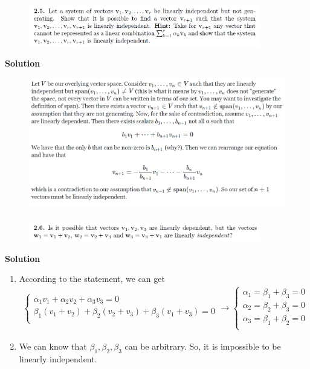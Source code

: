 \documentclass[cs4size,a4paper]{ctexart}
\numberwithin{equation}{section}
\numberwithin{table}{section}
\numberwithin{figure}{section}
\begin{document}
	\subsubsection{}
	\begin{figure}[H]
		\centering
		\includegraphics[width=0.9\textwidth]{1-2-5.png}
	\end{figure}
	\textbf{Solution}
	\begin{figure}[H]
		\centering
		\includegraphics[width=1\textwidth]{1-2-5-1.png}
	\end{figure}

	\subsubsection{}
	\begin{figure}[H]
		\centering
		\includegraphics[width=0.9\textwidth]{1-2-6.png}
	\end{figure}
	\textbf{Solution}
	\begin{enumerate}
		\item According to the statement, we can get
		\begin{align}
			\begin{cases}
				\alpha _1v_1+\alpha _2v_2+\alpha _3v_3=0\\
				\beta _1\left( v_1+v_2 \right) +\beta _2\left( v_2+v_3 \right) +\beta _3\left( v_1+v_3 \right) =0\\
			\end{cases}\rightarrow \begin{cases}
				\alpha _1=\beta _1+\beta _3 = 0\\
				\alpha _2=\beta _2+\beta _3 = 0\\
				\alpha _3=\beta _1+\beta _2 = 0\\
			\end{cases}
		\end{align}
		\item We can know that $\beta_1,\beta_2,\beta_3$ can be arbitrary. So, it is impossible to be linearly independent.
	\end{enumerate}
\end{document}

